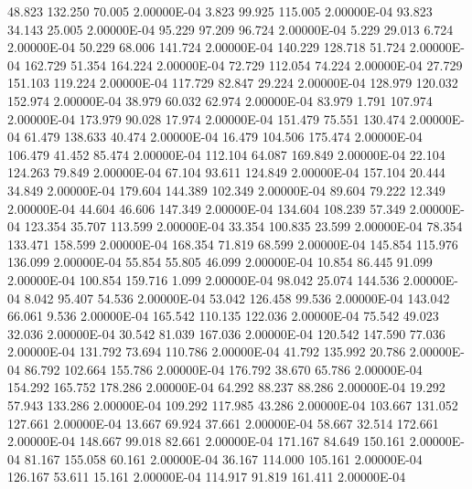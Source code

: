     48.823   132.250    70.005  2.00000E-04
     3.823    99.925   115.005  2.00000E-04
    93.823    34.143    25.005  2.00000E-04
    95.229    97.209    96.724  2.00000E-04
     5.229    29.013     6.724  2.00000E-04
    50.229    68.006   141.724  2.00000E-04
   140.229   128.718    51.724  2.00000E-04
   162.729    51.354   164.224  2.00000E-04
    72.729   112.054    74.224  2.00000E-04
    27.729   151.103   119.224  2.00000E-04
   117.729    82.847    29.224  2.00000E-04
   128.979   120.032   152.974  2.00000E-04
    38.979    60.032    62.974  2.00000E-04
    83.979     1.791   107.974  2.00000E-04
   173.979    90.028    17.974  2.00000E-04
   151.479    75.551   130.474  2.00000E-04
    61.479   138.633    40.474  2.00000E-04
    16.479   104.506   175.474  2.00000E-04
   106.479    41.452    85.474  2.00000E-04
   112.104    64.087   169.849  2.00000E-04
    22.104   124.263    79.849  2.00000E-04
    67.104    93.611   124.849  2.00000E-04
   157.104    20.444    34.849  2.00000E-04
   179.604   144.389   102.349  2.00000E-04
    89.604    79.222    12.349  2.00000E-04
    44.604    46.606   147.349  2.00000E-04
   134.604   108.239    57.349  2.00000E-04
   123.354    35.707   113.599  2.00000E-04
    33.354   100.835    23.599  2.00000E-04
    78.354   133.471   158.599  2.00000E-04
   168.354    71.819    68.599  2.00000E-04
   145.854   115.976   136.099  2.00000E-04
    55.854    55.805    46.099  2.00000E-04
    10.854    86.445    91.099  2.00000E-04
   100.854   159.716     1.099  2.00000E-04
    98.042    25.074   144.536  2.00000E-04
     8.042    95.407    54.536  2.00000E-04
    53.042   126.458    99.536  2.00000E-04
   143.042    66.061     9.536  2.00000E-04
   165.542   110.135   122.036  2.00000E-04
    75.542    49.023    32.036  2.00000E-04
    30.542    81.039   167.036  2.00000E-04
   120.542   147.590    77.036  2.00000E-04
   131.792    73.694   110.786  2.00000E-04
    41.792   135.992    20.786  2.00000E-04
    86.792   102.664   155.786  2.00000E-04
   176.792    38.670    65.786  2.00000E-04
   154.292   165.752   178.286  2.00000E-04
    64.292    88.237    88.286  2.00000E-04
    19.292    57.943   133.286  2.00000E-04
   109.292   117.985    43.286  2.00000E-04
   103.667   131.052   127.661  2.00000E-04
    13.667    69.924    37.661  2.00000E-04
    58.667    32.514   172.661  2.00000E-04
   148.667    99.018    82.661  2.00000E-04
   171.167    84.649   150.161  2.00000E-04
    81.167   155.058    60.161  2.00000E-04
    36.167   114.000   105.161  2.00000E-04
   126.167    53.611    15.161  2.00000E-04
   114.917    91.819   161.411  2.00000E-04
